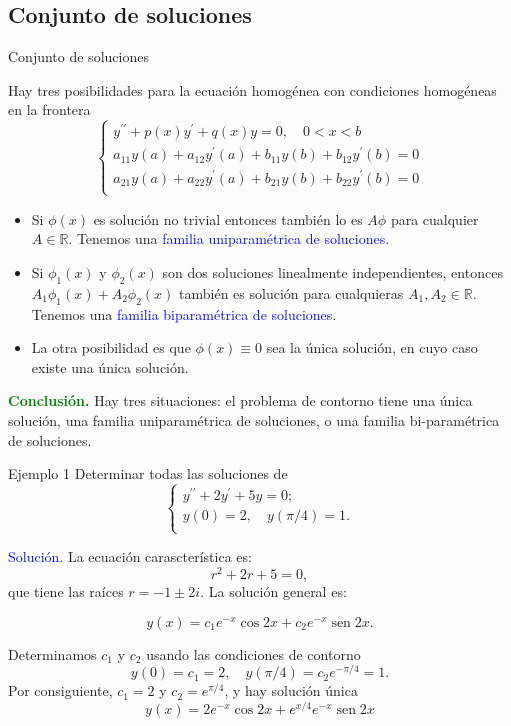 \documentclass[xcolor=dvipsnames,a4paper,10pt,handout]{beamer}
\newcommand{\rr}{\mathbb{R}}
\renewcommand{\emph}[1]{\textcolor{blue}{#1}}
\renewcommand{\textbf}[1]{\textcolor{green}{\bfseries #1}}
\DeclareMathOperator{\sen}{sen}
\begin{document}
\subsection{Conjunto de soluciones}

\begin{frame}{Conjunto de soluciones}

Hay tres posibilidades para la ecuación homogénea con condiciones homogéneas en la frontera
\[
 \left\{
        \begin{array}{l}
            y^{\prime \prime}+p(x) y^{\prime}+q(x) y=0, \quad 0<x<b\\
            a_{11} y(a)+a_{12} y^{\prime}(a)+b_{11} y(b)+b_{12} y^{\prime}(b)=0\\
            a_{21} y(a)+a_{22} y^{\prime}(a)+b_{21} y(b)+b_{22} y^{\prime}(b)=0\\ 
         \end{array}
 \right.
\]
\onslide<+->
\begin{itemize}


\item<+-> Si $\phi(x)$ es solución no trivial  entonces también lo es $A \phi$ para cualquier  $A\in\rr$. Tenemos una \emph{familia uniparamétrica de soluciones}.


\item<+-> Si $\phi_{1}(x)$ y $\phi_{2}(x)$ son  dos soluciones linealmente independientes, entonces $A_{1} \phi_{1}(x)+A_{2} \phi_{2}(x)$ también es solución para cualquieras  $A_{1}, A_{2}\in\rr$. Tenemos una \emph{familia biparamétrica de soluciones}.


\item<+-> La otra posibilidad es que $\phi(x) \equiv 0$ sea la única solución, en cuyo caso existe una única solución. 

\end{itemize} 
\onslide<+->
\textbf{Conclusión.} Hay tres situaciones: el problema de contorno  tiene una única solución, una familia  uniparamétrica de soluciones, o una familia bi-paramétrica de soluciones. 

\end{frame}


\begin{frame}{Ejemplo 1}
\onslide<+->
Determinar todas las soluciones de
\[
 \left\{
        \begin{array}{l}
                    y^{\prime \prime}+2 y^{\prime}+5 y=0;\\
                    y(0)=2, \quad y(\pi / 4)=1.\\
        \end{array}
 \right.
\]    
\onslide<+->

\emph{Solución.} La ecuación carascterística es:
$$r^{2}+2 r+5=0,$$
que tiene las raíces $r=-1 \pm 2 i$. La solución general es:

$$y(x)=c_{1} e^{-x} \cos 2 x+c_{2} e^{-x} \sen 2 x.$$ 

Determinamos $c_{1}$ y $c_{2}$ usando  las condiciones de contorno 
$$
y(0)=c_{1}=2, \quad y(\pi / 4)=c_{2} e^{-\pi / 4}=1 .
$$
Por consiguiente, $c_{1}=2$ y $c_{2}=e^{\pi / 4}$, y hay solución única
$$
y(x)=2 e^{-x} \cos 2 x+e^{x / 4} e^{-x} \sen 2 x
$$


\end{frame}
\end{document}

